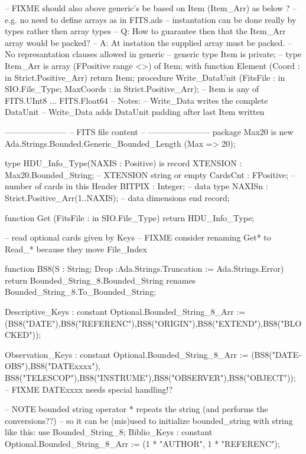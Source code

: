    -- FIXME should also above generic's be based on Item (Item_Arr) as below ?
   --       e.g. no need to define arrays as in FITS.ads
   --       instantation can be done really by types rather then array types
   --       Q: How to guarantee then that the Item_Arr array would be packed?
   --       A: At instation the supplied array must be packed.
   --          No represantation clauses allowed in generic
   --
   generic
    type Item is private;
--    type Item_Arr is array (FPositive range <>) of Item;
    with function Element (Coord : in Strict.Positive_Arr) return Item;
   procedure Write_DataUnit (FitsFile  : in  SIO.File_Type;
                             MaxCoords : in  Strict.Positive_Arr);
   -- Item is any of FITS.UInt8 ... FITS.Float64
   -- Notes:
   -- Write_Data writes the complete DataUnit
   -- Write_Data adds DataUnit padding after last Item written


   -----------------------
   -- FITS file content --
   -----------------------
   package Max20 is
        new Ada.Strings.Bounded.Generic_Bounded_Length (Max => 20);

   type HDU_Info_Type(NAXIS : Positive) is record
      XTENSION : Max20.Bounded_String;   -- XTENSION string or empty
      CardsCnt : FPositive;       -- number of cards in this Header
      BITPIX   : Integer;             -- data type
      NAXISn   : Strict.Positive_Arr(1..NAXIS); -- data dimensions
   end record;

   function  Get (FitsFile : in  SIO.File_Type)
      return HDU_Info_Type;


   -- read optional cards given by Keys
   -- FIXME consider renaming Get* to Read_* because they move File_Index

   function BS8(S : String; Drop :Ada.Strings.Truncation := Ada.Strings.Error) 
	return Bounded_String_8.Bounded_String
		renames Bounded_String_8.To_Bounded_String;

   Descriptive_Keys : constant Optional.Bounded_String_8_Arr :=
	(BS8("DATE"),BS8("REFERENC"),BS8("ORIGIN"),BS8("EXTEND"),BS8("BLOCKED"));

   Observation_Keys : constant Optional.Bounded_String_8_Arr :=
	(BS8("DATE-OBS"),BS8("DATExxxx"),
	 BS8("TELESCOP"),BS8("INSTRUME"),BS8("OBSERVER"),BS8("OBJECT"));
	-- FIXME DATExxxx needs special handling!?

   -- NOTE bounded string operator * repeats the string (and performs the conversions??)
   -- so it can be (mis)used to initialize bounded_string with string like this:
   use Bounded_String_8;
   Biblio_Keys : constant Optional.Bounded_String_8_Arr := 
		(1 * "AUTHOR", 1 * "REFERENC");

